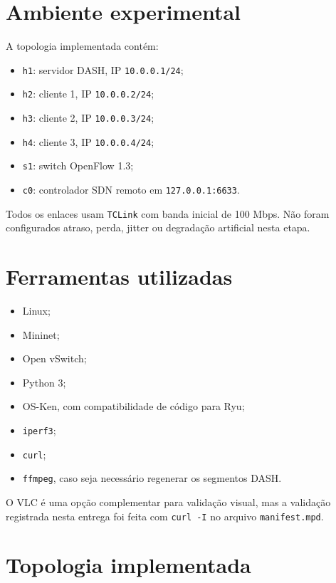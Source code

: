 \documentclass[12pt,a4paper]{article}
\begin{document}
\section{Ambiente experimental}

A topologia implementada contém:

\begin{itemize}
    \item \texttt{h1}: servidor DASH, IP \texttt{10.0.0.1/24};
    \item \texttt{h2}: cliente 1, IP \texttt{10.0.0.2/24};
    \item \texttt{h3}: cliente 2, IP \texttt{10.0.0.3/24};
    \item \texttt{h4}: cliente 3, IP \texttt{10.0.0.4/24};
    \item \texttt{s1}: switch OpenFlow 1.3;
    \item \texttt{c0}: controlador SDN remoto em \texttt{127.0.0.1:6633}.
\end{itemize}

Todos os enlaces usam \texttt{TCLink} com banda inicial de 100 Mbps. Não foram configurados atraso, perda, jitter ou degradação artificial nesta etapa.

\section{Ferramentas utilizadas}

\begin{itemize}
    \item Linux;
    \item Mininet;
    \item Open vSwitch;
    \item Python 3;
    \item OS-Ken, com compatibilidade de código para Ryu;
    \item \texttt{iperf3};
    \item \texttt{curl};
    \item \texttt{ffmpeg}, caso seja necessário regenerar os segmentos DASH.
\end{itemize}

O VLC é uma opção complementar para validação visual, mas a validação registrada nesta entrega foi feita com \texttt{curl -I} no arquivo \texttt{manifest.mpd}.

\section{Topologia implementada}
\end{document}
